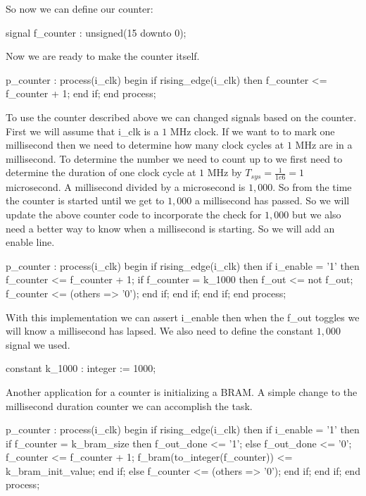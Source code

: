 So now we can define our counter:

\begin{VHDLlisting}[tabsize=4]
signal f_counter : unsigned(15 downto 0);
\end{VHDLlisting}

Now we are ready to make the counter itself.

\begin{VHDLlisting}[tabsize=4]
p_counter : process(i_clk) 
begin
    if rising_edge(i_clk) then
        f_counter <= f_counter + 1;
    end if;
end process;
\end{VHDLlisting}

To use the counter described above we can changed signals based on the counter. First we will assume that i\_clk is a $1$ \ac{MHz} clock. If we want to to mark one millisecond then we need to determine how many clock cycles at $1$ \ac{MHz} are in a millisecond. To determine the number we need to count up to we first need to determine the duration of one clock cycle at $1$ \ac{MHz} by $T_{sys}=\frac{1}{1e6}=1$ microsecond. A millisecond divided by a microsecond is $1,000$. So from the time the counter is started until we get to $1,000$ a millisecond has passed. So we will update the above counter code to incorporate the check for $1,000$ but we also need a better way to know when a millisecond is starting. So we will add an enable line.

\begin{VHDLlisting}[tabsize=4]
p_counter : process(i_clk) 
begin
	if rising_edge(i_clk) then
		if i_enable = '1' then
			f_counter <= f_counter + 1;
			if f_counter = k_1000 then
				f_out <= not f_out;
				f_counter <= (others => '0');
			end if;
		end if;
	end if;
end process;
\end{VHDLlisting}

With this implementation we can assert i\_enable then when the f\_out toggles we will know a millisecond has lapsed. We also need to define the constant $1,000$ signal we used. 

\begin{VHDLlisting}[tabsize=4]
constant k\_1000 : integer := 1000;
\end{VHDLlisting}

Another application for a counter is initializing a \ac{BRAM}. A simple change to the millisecond duration counter we can accomplish the task.

\begin{VHDLlisting}[tabsize=4]
p_counter : process(i_clk) 
begin
    if rising_edge(i_clk) then
        if i_enable = '1' then
            if f_counter = k_bram_size then
                f_out_done <= '1';
            else
                f_out_done <= '0';
                f_counter <= f_counter + 1;
                f_bram(to_integer(f_counter)) <= k_bram_init_value;
            end if;
        else	
            f_counter <= (others => '0');
        end if;
    end if;
end process;
\end{VHDLlisting}

